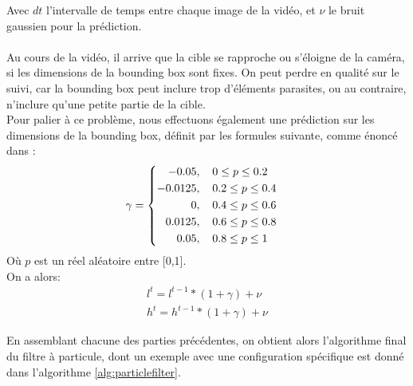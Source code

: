 Avec $dt$ l'intervalle de temps entre chaque image de la vidéo, et $\nu$ le bruit gaussien pour la prédiction.\\
\\
Au cours de la vidéo, il arrive que la cible se rapproche ou s'éloigne de la caméra, si les dimensions de la bounding box sont fixes. On peut perdre en qualité sur le suivi, car la bounding box peut inclure trop d'éléments parasites, ou au contraire, n'inclure qu'une petite partie de la cible.\\
Pour palier à ce problème, nous effectuons également une prédiction sur les dimensions de la bounding box, définit par les formules suivante, comme énoncé dans \cite{kong_particle_2019}:
\begin{equation} \label{eq:gamma}
\gamma=
\begin{cases}
\begin{aligned}
	-0.05,& \hspace{0.4cm}		0 \leq p \leq 0.2\\
    -0.0125,& \hspace{0.4cm}	0.2 \le p \leq 0.4\\
    0,& \hspace{0.4cm}			0.4 \le p \leq 0.6\\
    0.0125,& \hspace{0.4cm}		0.6 \le p \leq 0.8\\
    0.05,& \hspace{0.4cm}		0.8 \le p \leq 1
\end{aligned}
\end{cases}
\end{equation}
Où $p$ est un réel aléatoire entre [0,1].\\
On a alors:
\begin{equation} \label{eq:Bbox}
\begin{split}
l^{t} = l^{t-1} * (1+\gamma) + \nu\\
h^{t} = h^{t-1} * (1+\gamma) + \nu
\end{split}
\end{equation}

En assemblant chacune des parties précédentes, on obtient alors l'algorithme final du filtre à particule, dont un exemple avec une configuration spécifique est donné dans l'algorithme \ref{alg:particlefilter}.\\
\vspace{1cm}


